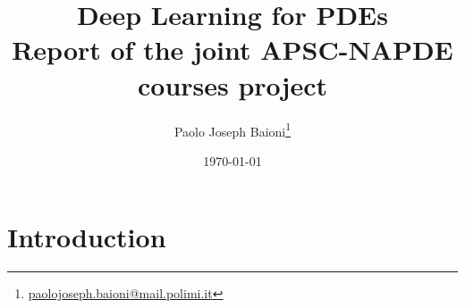 \documentclass[12pt, a4paper]{report}
\title{\textbf{Deep Learning for PDEs}\\
			\large Report of the joint APSC-NAPDE courses project}
\author{Paolo Joseph Baioni\footnote{\href{mailto:paolojoseph.baioni@mail.polimi.it}{paolojoseph.baioni@mail.polimi.it}}}
\date{\today}
\theoremstyle{definition}
\renewcommand*{\thefootnote}{\fnsymbol{footnote}}
\begin{document}
	
\maketitle

\renewcommand*{\thefootnote}{\arabic{footnote}}
\setcounter{footnote}{0}

	
	



	
\tableofcontents
\clearpage
	

\chapter*{Introduction}\label{introduction}
\end{document}
